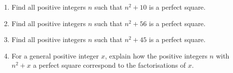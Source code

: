 \begin{enumerate}
\item[(a)] Find all positive integers $n$ such that $n^2+10$ is a perfect square.
\item[(b)] Find all positive integers $n$ such that $n^2+56$ is a perfect square.
\item[(c)] Find all positive integers $n$ such that $n^2+45$ is a perfect square.
\item[(d)] For a general positive integer $x$, explain how the positive integers $n$ with $n^2+x$ a perfect square correspond to the factorisations of $x$.
\end{enumerate}

